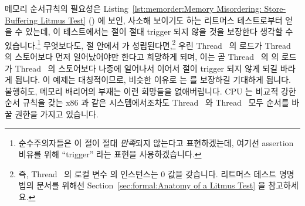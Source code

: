 메모리 순서규칙의 필요성은
Listing~\ref{lst:memorder:Memory Misordering: Store-Buffering Litmus Test}
()
에 보인,
사소해 보이기도 하는 리트머스 테스트로부터 얻을 수 있는데, 이 테스트에서는
 절이 절대 trigger 되지 않을 것을 보장한다 생각할 수
있습니다.\footnote{
	순수주의자들은 이  절이 절대 \emph{만족}되지 않는다고
	표현하겠는데, 여기선 assertion 비유를 위해 ``trigger'' 라는 표현을
	사용하겠습니다.}
무엇보다도,  절 안에서  가 성립된다면,\footnote{
	즉, Thread~ 의 로컬 변수  의 인스턴스는 0 값을
	갖습니다.
	리트머스 테스트 명명법의 문서를 위해선
	Section~\ref{sec:formal:Anatomy of a Litmus Test} 을 참고하세요.}
우린 Thread~ 의  로드가 Thread~ 의  스토어보다
먼저 일어났어야만 한다고 희망하게 되며, 이는 곧 Thread~ 의  의
로드가 Thread~ 의  스토어보다 나중에 일어나서 
이어서  절이 trigger 되지 않게 되길 바라게 됩니다.
이 예제는 대칭적이므로, 비슷한 이유로  는  를
보장하길 기대하게 됩니다.
불행히도, 메모리 배리어의 부재는 이런 희망들을 없애버립니다.
CPU 는 비교적 강한 순서 규칙을 갖는 x86 과 같은 시스템에서조차도
Thread~ 와 Thread~ 모두 순서를 바꿀 권한을 가지고 있습니다.

